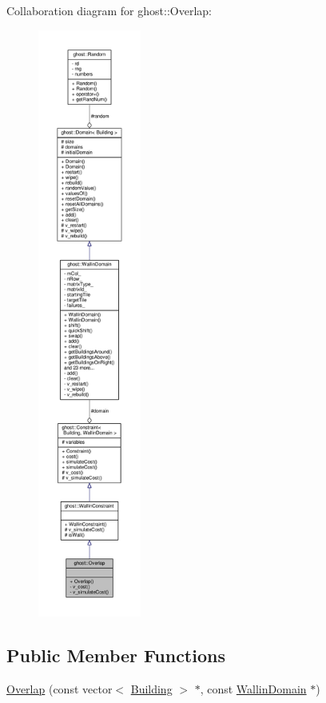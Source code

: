 Collaboration diagram for ghost\-:\-:Overlap\-:\nopagebreak
\begin{figure}[H]
\begin{center}
\leavevmode
\includegraphics[height=550pt]{classghost_1_1Overlap__coll__graph}
\end{center}
\end{figure}
\subsection*{Public Member Functions}
\begin{DoxyCompactItemize}
\item 
\hyperlink{classghost_1_1Overlap_a256dfd7655e1937ed0d13368527e9eec}{Overlap} (const vector$<$ \hyperlink{classghost_1_1Building}{Building} $>$ $\ast$, const \hyperlink{classghost_1_1WallinDomain}{Wallin\-Domain} $\ast$)
\end{DoxyCompactItemize}
